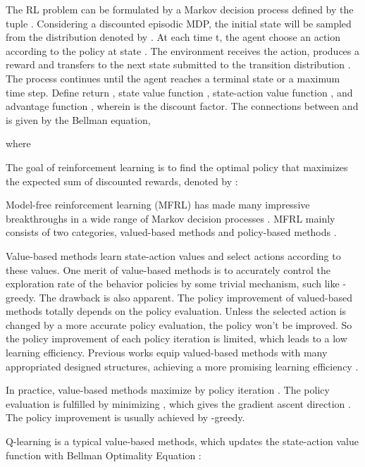 \documentclass[nohyperref]{article}
\theoremstyle{plain}
\begin{document}
 The RL problem can be formulated by a Markov decision process \citep[MDP]{howard1960dynamic} defined by the tuple  . 
 Considering a discounted episodic MDP, the initial state  will be sampled from the distribution denoted by . 
 At each time t, the agent choose an action  according to the policy  at state . 
 The environment receives the action, produces a reward  and transfers to the next state   submitted to the transition distribution . 
 The process continues until the agent reaches a terminal state or a maximum time step. 
 Define return , state value function , state-action value function , and advantage function , wherein  is the discount factor.
The connections between  and  is given by the Bellman equation,

where

The goal of reinforcement learning is to find the optimal policy  that maximizes the expected sum of discounted rewards, denoted by  \citep{sutton}:







Model-free reinforcement learning (MFRL) has made many impressive breakthroughs in a wide range of Markov decision processes  \citep[MDP]{alpha_star,ftw,agent57}.
MFRL mainly consists of two categories, valued-based methods \citep{dqn,rainbow} and policy-based methods \citep{trpo,ppo,impala}.

Value-based methods learn state-action values and select actions according to these values. 
One merit of value-based methods is to accurately control the exploration rate of the behavior policies by some trivial mechanism, such like -greedy.
The drawback is also apparent. 
The policy improvement of valued-based methods totally depends on the policy evaluation. 
Unless the selected action is changed by a more accurate policy evaluation, the policy won't be improved. 
So the policy improvement of each policy iteration is limited, which leads to a low learning efficiency.
Previous works equip valued-based methods with many appropriated designed structures, achieving a more promising learning efficiency \citep{dueling_q,priority_q,r2d2}.


In practice, value-based methods maximize  by policy iteration \citep{sutton}. 
The policy evaluation is fulfilled by minimizing , which gives the gradient ascent direction 
. 
The policy improvement is usually achieved by -greedy.

Q-learning is a typical value-based methods, which updates the state-action value function  with Bellman Optimality Equation \citep{qlearning}: 
\end{document}
